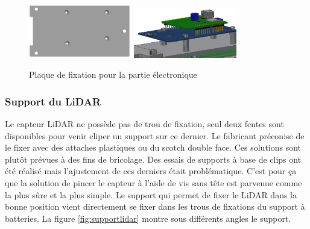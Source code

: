 \begin{figure}[H]
    \centering
    \includegraphics[width=0.4\textwidth]{Images/photos_PGA/plaquesmodule.PNG}
    \includegraphics[width=0.4\textwidth]{Images/photos_PGA/PCB.PNG}
    \caption{Plaque de fixation pour la partie électronique}
    \label{fig:fixelectronique}
\end{figure}

\subsubsection{Support du LiDAR}

Le capteur LiDAR ne possède pas de trou de fixation, seul deux fentes sont disponibles pour venir 
cliper un support sur ce dernier. Le fabricant préconise de le fixer avec des attaches plastiques ou du scotch 
double face. Ces solutions sont plutôt prévues à des fins de bricolage. Des essais de supports à base 
de clips ont été réalisé mais l’ajustement de ces derniers était problématique. C’est pour ça que la 
solution de pincer le capteur à l’aide de vis sans tête est parvenue comme la plus sûre et la plus simple. 
Le support qui permet de fixer le LiDAR dans la bonne position vient directement se fixer dans les 
trous de fixations du support à batteries. La figure \ref{fig:supportlidar} montre sous différents angles 
le support.

